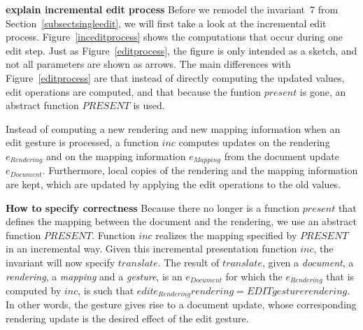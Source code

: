 \documentclass[twoside,epsf]{report}
\begin{document}
{\bf explain incremental edit process} Before we remodel the invariant~7 from Section~\ref{subsectsingleedit}, we will first take a look at the incremental edit process. Figure~\ref{inceditprocess} shows the computations that occur during one edit step. Just as Figure~\ref{editprocess}, the figure is only intended as a sketch, and not all parameters are shown as arrows. The main differences with Figure~\ref{editprocess} are that instead of directly computing the updated values, edit operations are computed, and that because the funtion $present$ is gone, an abstract function $PRESENT$ is used. 

Instead of computing a new rendering and new mapping information when an edit gesture is processed, a function $inc$ computes updates on the rendering $e_{Rendering}$ and on the mapping information $e_{Mapping}$ from the document update $e_{Document}$. Furthermore, local copies of the rendering and the mapping information are kept, which are updated by applying the edit operations to the old values.

{\bf How to specify correctness} Because there no longer is a function $present$ that defines the mapping between the document and the rendering, we use an abstract function $PRESENT$. Function $inc$ realizes the mapping specified by $PRESENT$ in an incremental way. Given this incremental presentation function $inc$, the invariant will now specify $translate$. The result of $translate$, given a {\it document}, a {\it rendering}, a {\it mapping} and a {\it gesture}, is an $e_{Document}$ for which the $e_{Rendering}$ that is computed by $inc$, is such that $edit e_{Rendering} rendering = EDIT gesture rendering$. In other words, the gesture gives rise to a document update, whose corresponding rendering update is the desired effect of the edit gesture. 
\end{document}
